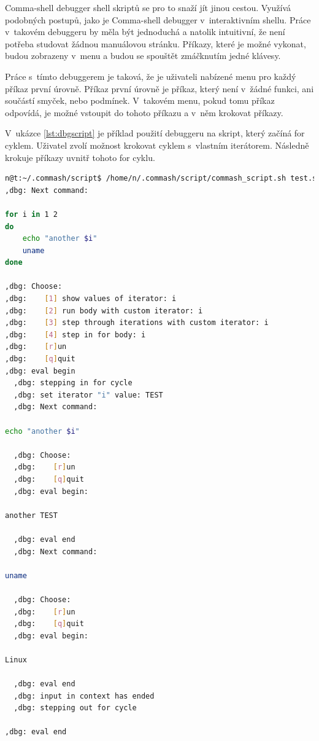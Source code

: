 \documentclass[thesis=M,czech]{FITthesis}[2012/06/26]
\begin{document}
Comma-shell debugger shell skriptů se pro to snaží jít jinou cestou. Využívá podobných postupů, jako je Comma-shell debugger v~interaktivním shellu. Práce v~takovém debuggeru by měla být jednoduchá a natolik intuitivní, že není potřeba studovat žádnou manuálovou stránku. Příkazy, které je možné vykonat, budou zobrazeny v~menu a budou se spouštět zmáčknutím jedné klávesy.

Práce s~tímto debuggerem je taková, že je uživateli nabízené menu pro každý příkaz první úrovně. Příkaz první úrovně je příkaz, který není v~žádné funkci, ani součástí smyček, nebo podmínek. V~takovém menu, pokud tomu příkaz odpovídá, je možné vstoupit do tohoto příkazu a v~něm krokovat příkazy.

V~ukázce \ref{lst:dbgscript} je příklad použití debuggeru na skript, který začíná for cyklem. Uživatel zvolí možnost krokovat cyklem s~vlastním iterátorem. Následně krokuje příkazy uvnitř tohoto for cyklu.

\noindent
\begin{minipage}{\linewidth}
\begin{lstlisting}[language=bash, caption={Debugger shell skriptu}, label={lst:dbgscript}]
n@t:~/.commash/script$ /home/n/.commash/script/commash_script.sh test.sh
,dbg: Next command:

for i in 1 2
do
	echo "another $i"
	uname
done

,dbg: Choose:
,dbg:    [1] show values of iterator: i
,dbg:    [2] run body with custom iterator: i
,dbg:    [3] step through iterations with custom iterator: i
,dbg:    [4] step in for body: i
,dbg:    [r]un
,dbg:    [q]quit
,dbg: eval begin
  ,dbg: stepping in for cycle
  ,dbg: set iterator "i" value: TEST
  ,dbg: Next command:

echo "another $i"

  ,dbg: Choose:
  ,dbg:    [r]un
  ,dbg:    [q]quit
  ,dbg: eval begin:

another TEST

  ,dbg: eval end
  ,dbg: Next command:

uname

  ,dbg: Choose:
  ,dbg:    [r]un
  ,dbg:    [q]quit
  ,dbg: eval begin:

Linux

  ,dbg: eval end
  ,dbg: input in context has ended
  ,dbg: stepping out for cycle

,dbg: eval end
\end{lstlisting}
\end{minipage}
\end{document}
